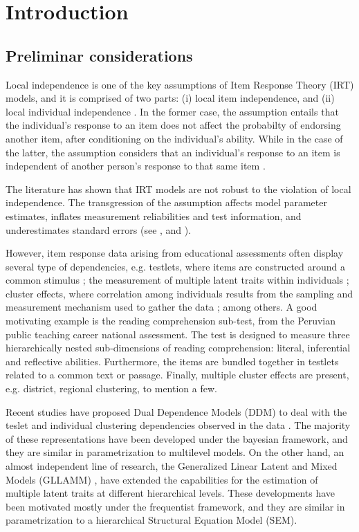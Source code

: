 \chapter{Introduction}

\section{Preliminar considerations}

Local independence is one of the key assumptions of Item Response Theory (IRT) models, and it is comprised of two parts: (i) local item independence, and (ii) local individual independence \cite{Baker_2001, Hambleton_et_al_1991a}. In the former case, the assumption entails that the individual's response to an item does not affect the probabilty of endorsing another item, after conditioning on the individual's ability. While in the case of the latter, the assumption considers that an individual's response to an item is independent of another person's response to that same item \cite{Reckase_2009}. 

The literature has shown that IRT models are not robust to the violation of local independence. The transgression of the assumption affects model parameter estimates, inflates measurement reliabilities and test information, and underestimates standard errors (see \citet{Yen_1984, Chen_et_al_1997}, and  \citet{Jiao_et_al_2012}). 

However, item response data arising from educational assessments often display several type of dependencies, e.g. testlets, where items are constructed around a common stimulus \cite{Wainer_et_al_2007}; the measurement of multiple latent traits within individuals \cite{Reckase_2009}; cluster effects, where correlation among individuals results from the sampling and measurement mechanism used to gather the data \cite{Raudenbush_et_al_2002}; among others. A good motivating example is the reading comprehension sub-test, from the Peruvian public teaching career national assessment. The test is designed to measure three hierarchically nested sub-dimensions of reading comprehension: literal, inferential and reflective abilities. Furthermore, the items are bundled together in testlets related to a common text or passage. Finally, multiple cluster effects are present, e.g. district, regional clustering, to mention a few.

Recent studies have proposed Dual Dependence Models (DDM) to deal with the teslet and individual clustering dependencies observed in the data \cite{Fujimoto_2020, Fujimoto_2018a, Fujimoto_2018b, Jiao_et_al_2012, Flores_2012, Fox_2010, Reckase_2009, Bradlow_1999}. The majority of these representations have been developed under the bayesian framework, and they are similar in parametrization to multilevel models. On the other hand, an almost independent line of research, the Generalized Linear Latent and Mixed Models (GLLAMM) \cite{Rabe_et_al_2004a, Rabe_et_al_2004b, Skrondal_et_al_2004a, Rabe_et_al_2012}, have extended the capabilities for the estimation of multiple latent traits at different hierarchical levels. These developments have been motivated mostly under the frequentist framework, and they are similar in parametrization to a hierarchical Structural Equation Model (SEM).

